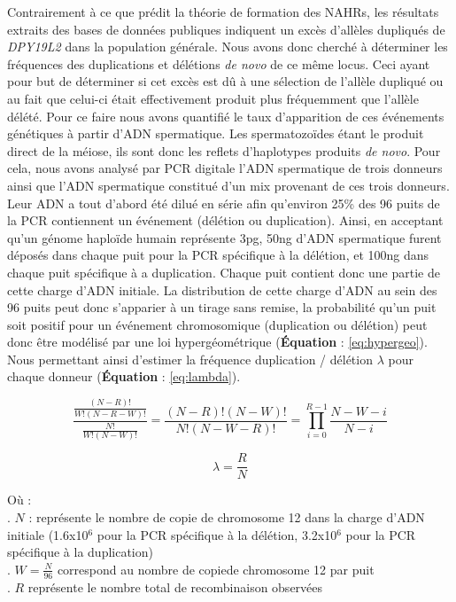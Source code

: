 \documentclass[12pt,twoside]{ugathesis}
\begin{document}
Contrairement à ce que prédit la théorie de formation des NAHRs, les
résultats extraits des bases de données publiques indiquent un excès
d'allèles dupliqués de \emph{DPY19L2} dans la population générale. Nous
avons donc cherché à déterminer les fréquences des duplications et
délétions \emph{de novo} de ce même locus. Ceci ayant pour but de
déterminer si cet excès est dû à une sélection de l'allèle dupliqué ou
au fait que celui-ci était effectivement produit plus fréquemment que
l'allèle délété. Pour ce faire nous avons quantifié le taux d'apparition
de ces événements génétiques à partir d'ADN spermatique. Les
spermatozoïdes étant le produit direct de la méiose, ils sont donc les
reflets d'haplotypes produits \emph{de novo}. Pour cela, nous avons
analysé par PCR digitale l'ADN spermatique de trois donneurs ainsi que
l'ADN spermatique constitué d'un mix provenant de ces trois donneurs.
Leur ADN a tout d'abord été dilué en série afin qu'environ 25\% des 96
puits de la PCR contiennent un événement (délétion ou duplication).
Ainsi, en acceptant qu'un génome haploïde humain représente 3pg, 50ng
d'ADN spermatique furent déposés dans chaque puit pour la PCR spécifique
à la délétion, et 100ng dans chaque puit spécifique à a duplication.
Chaque puit contient donc une partie de cette charge d'ADN initiale. La
distribution de cette charge d'ADN au sein des 96 puits peut donc
s'apparier à un tirage sans remise, la probabilité qu'un puit soit
positif pour un événement chromosomique (duplication ou délétion) peut
donc être modélisé par une loi hypergéométrique (\textbf{Équation} :
\eqref{eq:hypergeo}). Nous permettant ainsi d'estimer la fréquence
duplication / délétion \(\lambda\) pour chaque donneur
(\textbf{Équation} : \eqref{eq:lambda}).

\begin{equation} 
\frac{\frac{(N - R)!}{W!(N-R-W)!}}{\frac{N!}{W!(N-W)!}} = \frac{(N-R)!(N-W)!}{N!(N-W-R)!} = \prod_{i=0}^{R-1}{\frac{N-W-i}{N-i}}
\label{eq:hypergeo}
\end{equation}

\begin{equation} 
\lambda = \frac{R}{N}
\label{eq:lambda}
\end{equation}

Où :\\
. \(N\) : représente le nombre de copie de chromosome 12 dans la charge
d'ADN initiale (1.6x10\({^6}\) pour la PCR spécifique à la délétion,
3.2x10\({^6}\) pour la PCR spécifique à la duplication)\\
. \(W = \frac{N}{96}\) correspond au nombre de copiede chromosome 12 par
puit\\
. \(R\) représente le nombre total de recombinaison observées
\end{document}
